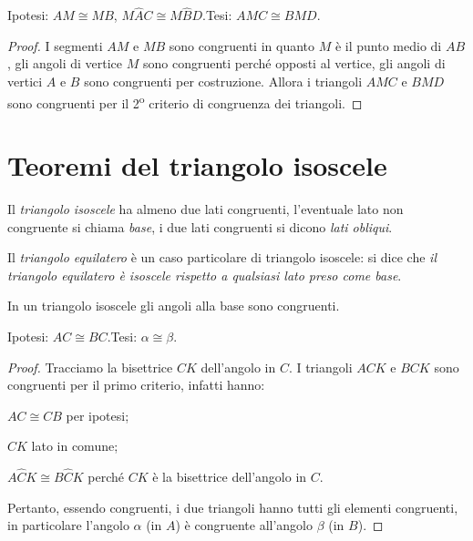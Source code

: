 \begin{exrig}
\begin{esempio}
\noindent Ipotesi: $AM\cong MB$, $M\widehat{A}C\cong 
M\widehat{B}D$.\tab Tesi: $AMC\cong BMD$.

\begin{proof}
I segmenti $AM$ e $MB$ sono congruenti in quanto $M$ è il punto medio 
di $AB$, gli angoli di vertice $M$ sono congruenti perché opposti al 
vertice, gli angoli di vertici $A$ e $B$ sono congruenti per 
costruzione. Allora i triangoli $AMC$ e $BMD$ sono congruenti per il 
2\textsuperscript{o} criterio di congruenza dei triangoli.
\end{proof}
\end{esempio}
\end{exrig}

\section{Teoremi del triangolo 
isoscele}\label{sect:teoremi_triangolo_isoscele}

Il \emph{triangolo isoscele} ha almeno due lati congruenti, 
l'eventuale lato non congruente si chiama \emph{base}, i due lati 
congruenti si dicono \emph{lati obliqui}.

Il \emph{triangolo equilatero} è un caso particolare di triangolo 
isoscele: si dice che \emph{il triangolo equilatero è isoscele 
rispetto a qualsiasi lato preso come base}.

\begin{teorema}
In un triangolo isoscele gli angoli alla base sono congruenti.
\end{teorema}


\begin{inaccessibleblock}
 \begin{figure}[htb]
\centering
\end{figure}
\end{inaccessibleblock}

\noindent Ipotesi: $AC\cong BC$.\tab Tesi: $\alpha\cong \beta$.

\begin{proof}
Tracciamo la bisettrice $CK$ dell'angolo in $C$.
I triangoli $ACK$ e $BCK$ sono congruenti per il primo criterio, 
infatti hanno:
\begin{itemize*}
\item $AC\cong CB$ per ipotesi;
\item $CK$ lato in comune;
\item $A\widehat{C}K\cong B\widehat{C}K$ perché $CK$ è la bisettrice 
dell'angolo in $C$.
\end{itemize*}
Pertanto, essendo congruenti, i due triangoli hanno tutti gli 
elementi congruenti, in particolare l'angolo $\alpha$ (in $A$) è 
congruente all'angolo $\beta$ (in $B$).
\end{proof}

